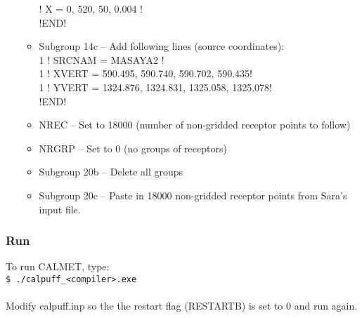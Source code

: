 \documentclass[10pt,a4paper]{article}
\newcommand\tab[1][0.5cm]{\hspace*{#1}}
\begin{document}
\begin{itemize}
\begin{itemize}
\tab ! X = 0, 520, 50, 0.004 !\\
\tab !END!
\item Subgroup 14c -- Add following lines (source coordinates): \\
\tab 1 ! SRCNAM = MASAYA2 !\\
\tab 1 ! XVERT = 590.495, 590.740, 590.702, 590.435!  \\
\tab 1 ! YVERT = 1324.876, 1324.831, 1325.058, 1325.078!\\
\tab !END!
\item NREC -- Set to 18000 (number of non-gridded receptor points to follow)
\item NRGRP -- Set to 0 (no groups of receptors)
\item Subgroup 20b -- Delete all groups
\item Subgroup 20c -- Paste in 18000 non-gridded receptor points from Sara's input file.

\end{itemize}
\end{itemize}

\subsubsection{Run}
To run CALMET, type:\\
\tab \texttt{\$ ./calpuff\_<compiler>.exe}\\\\
Modify calpuff.inp so the the restart flag (RESTARTB) is set to 0 and run again.
\end{document}
